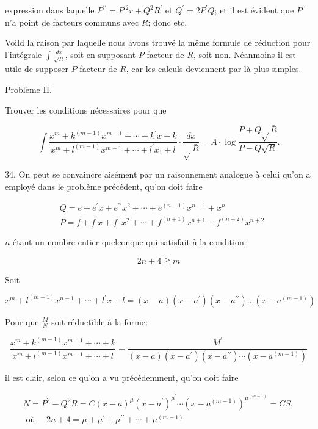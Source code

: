 \documentclass{article}
\begin{document}
expression dans laquelle \(P^{\prime \prime}=P^{\prime 2} r+Q^{2} R^{\prime}\) et \(Q^{\prime}=2 P^{\prime} Q\); et il est évident que \(P^{\prime \prime}\) n'a point de facteurs communs avec \(R\); donc etc.

Voild la raison par laquelle nous avons trouvé la même formule de réduction pour l'intégrale \(\int \frac{d x}{\sqrt{R}}\), soit en supposant \(P\) facteur de \(R\), soit non. Néanmoins il est utile de supposer \(P\) facteur de \(R\), car les calculs deviennent par là plus simples.

Problème II.

Trouver les conditions nécessaires pour que

\[
\int \frac{x^{m}+k^{(m-1)} x^{m-1}+\cdots+k^{\prime} x+k}{x^{m}+l^{(m-1)} x^{m-1}+\cdots+l^{\prime} x_{1}+l} \cdot \frac{d x}{\sqrt{ } \bar{R}}=A \cdot \log \frac{P+Q \sqrt{ } \bar{R}}{P-Q \sqrt{R}} .
\]

34. On peut se convaincre aisément par un raisonnement analogue à celui qu'on a employé dans le problème précédent, qu'on doit faire

\[
\begin{aligned}
& Q=e+e^{\prime} x+e^{\prime \prime} x^{2}+\cdots+e^{(n-1)} x^{n-1}+x^{n} \\
& P=f+f^{\prime} x+f^{\prime \prime} x^{2}+\cdots+f^{(n+1)} x^{n+1}+f^{(n+2)} x^{n+2}
\end{aligned}
\]

\(n\) étant un nombre entier quelconque qui satisfait à la condition:

\[
2 n+4 \geqq m
\]

Soit

\[
x^{m}+l^{(m-1)} x^{n-1}+\cdots+l^{\prime} x+l=(x-a)\left(x-a^{\prime}\right)\left(x-a^{\prime \prime}\right) \ldots\left(x-a^{(m-1)}\right)
\]

Pour que \(\frac{M}{N}\) soit réductible à la forme:

\[
\frac{x^{m}+k^{(m-1)} x^{m-1}+\cdots+k}{x^{m}+l^{(m-1)} x^{m-1}+\cdots+l}=\frac{M^{\prime}}{(x-a)\left(x-a^{\prime}\right)\left(x-a^{\prime \prime}\right) \cdots\left(x-a^{(m-1)}\right)}
\]

il est clair, selon ce qu'on a vu précédemment, qu'on doit faire

\[
\begin{gathered}
N=P^{2}-Q^{2} R=C(x-a)^{\mu}\left(x-a^{\prime}\right)^{\mu^{\prime}} \cdots\left(x-a^{(m-1)}\right)^{\mu^{(m-1)}}=C S, \\
\text { où } \quad 2 n+4=\mu+\mu^{\prime}+\mu^{\prime \prime}+\cdots+\mu^{(m-1)}
\end{gathered}
\]
\end{document}
